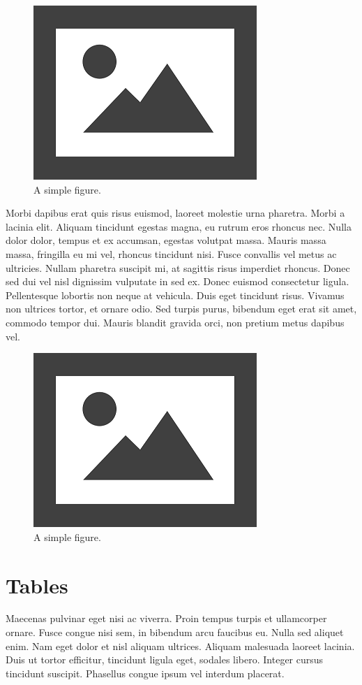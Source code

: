 \documentclass{article}
\begin{document}
	\begin{figure}[H]
		\centering
		\includegraphics[width=0.3\linewidth]{figures/fig2}
		\caption[Figure 2]{A simple figure.}
		\label{fig:fig2}
	\end{figure}

	Morbi dapibus erat quis risus euismod, laoreet molestie urna pharetra. Morbi a lacinia elit. Aliquam tincidunt egestas magna, eu rutrum eros rhoncus nec. Nulla dolor dolor, tempus et ex accumsan, egestas volutpat massa. Mauris massa massa, fringilla eu mi vel, rhoncus tincidunt nisi. Fusce convallis vel metus ac ultricies. Nullam pharetra suscipit mi, at sagittis risus imperdiet rhoncus. Donec sed dui vel nisl dignissim vulputate in sed ex. Donec euismod consectetur ligula. Pellentesque lobortis non neque at vehicula. Duis eget tincidunt risus. Vivamus non ultrices tortor, et ornare odio. Sed turpis purus, bibendum eget erat sit amet, commodo tempor dui. Mauris blandit gravida orci, non pretium metus dapibus vel.
	
	\begin{figure}[H]
		\centering
		\includegraphics[width=0.3\linewidth]{figures/fig3}
		\caption[Figure 3]{A simple figure.}
		\label{fig:fig3}
	\end{figure}

	\section{Tables}
	
	Maecenas pulvinar eget nisi ac viverra. Proin tempus turpis et ullamcorper ornare. Fusce congue nisi sem, in bibendum arcu faucibus eu. Nulla sed aliquet enim. Nam eget dolor et nisl aliquam ultrices. Aliquam malesuada laoreet lacinia. Duis ut tortor efficitur, tincidunt ligula eget, sodales libero. Integer cursus tincidunt suscipit. Phasellus congue ipsum vel interdum placerat.
	
\end{document}
